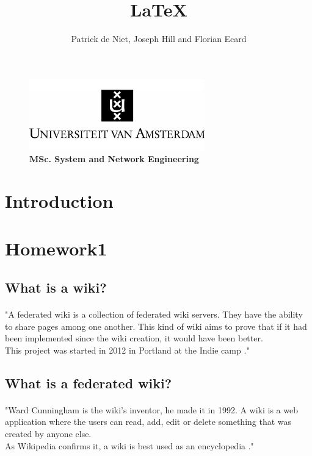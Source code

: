 \documentclass[10pt,a4paper]{article}
\author{Patrick de Niet, Joseph Hill and Florian Ecard}
\title{\LaTeX}
\begin{document}
    
\begin{figure}[t]
\centering
\includegraphics[width=7.6cm]{uva.jpg}\\
\textbf{{MSc. System and Network Engineering}}
\end{figure}
\maketitle


\newpage
\section{Introduction}
\paragraph{}


\newpage
\tableofcontents


\newpage
\section{Homework1}

\subsection{What is a wiki?}

\paragraph{}"A federated wiki is a collection of federated wiki servers. They have the ability to share pages among one another. This kind of wiki aims to prove that if it had been implemented since the wiki creation, it would have been better.\\
This project was started in 2012 in Portland at the Indie camp \cite{floref2}."\cite{floref1}

\subsection{What is a federated wiki?}

\paragraph{}"Ward Cunningham is the wiki's inventor, he made it in 1992.
A wiki is a web application where the users can read, add, edit or delete something that was created by anyone else.\\
As Wikipedia confirms it, a wiki is best used as an encyclopedia \cite{floref3}."\cite{floref1}
\end{document}
